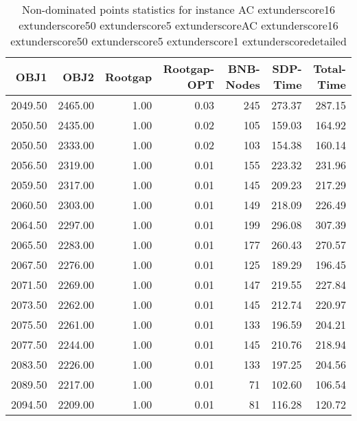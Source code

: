 \begin{table}
\caption{Non-dominated points statistics for instance AC	extunderscore16	extunderscore50	extunderscore5	extunderscoreAC	extunderscore16	extunderscore50	extunderscore5	extunderscore1	extunderscoredetailed}
\label{tab:stats/AC_16_50_5_AC_16_50_5_1_detailed}
\begin{tabular}{rrrrrrr}
\toprule
OBJ1 & OBJ2 & Rootgap & Rootgap-OPT & BNB-Nodes & SDP-Time & Total-Time \\
\midrule
2049.50 & 2465.00 & 1.00 & 0.03 & 245 & 273.37 & 287.15 \\
2050.50 & 2435.00 & 1.00 & 0.02 & 105 & 159.03 & 164.92 \\
2050.50 & 2333.00 & 1.00 & 0.02 & 103 & 154.38 & 160.14 \\
2056.50 & 2319.00 & 1.00 & 0.01 & 155 & 223.32 & 231.96 \\
2059.50 & 2317.00 & 1.00 & 0.01 & 145 & 209.23 & 217.29 \\
2060.50 & 2303.00 & 1.00 & 0.01 & 149 & 218.09 & 226.49 \\
2064.50 & 2297.00 & 1.00 & 0.01 & 199 & 296.08 & 307.39 \\
2065.50 & 2283.00 & 1.00 & 0.01 & 177 & 260.43 & 270.57 \\
2067.50 & 2276.00 & 1.00 & 0.01 & 125 & 189.29 & 196.45 \\
2071.50 & 2269.00 & 1.00 & 0.01 & 147 & 219.55 & 227.84 \\
2073.50 & 2262.00 & 1.00 & 0.01 & 145 & 212.74 & 220.97 \\
2075.50 & 2261.00 & 1.00 & 0.01 & 133 & 196.59 & 204.21 \\
2077.50 & 2244.00 & 1.00 & 0.01 & 145 & 210.76 & 218.94 \\
2083.50 & 2226.00 & 1.00 & 0.01 & 133 & 197.25 & 204.56 \\
2089.50 & 2217.00 & 1.00 & 0.01 & 71 & 102.60 & 106.54 \\
2094.50 & 2209.00 & 1.00 & 0.01 & 81 & 116.28 & 120.72 \\
\bottomrule
\end{tabular}
\end{table}

